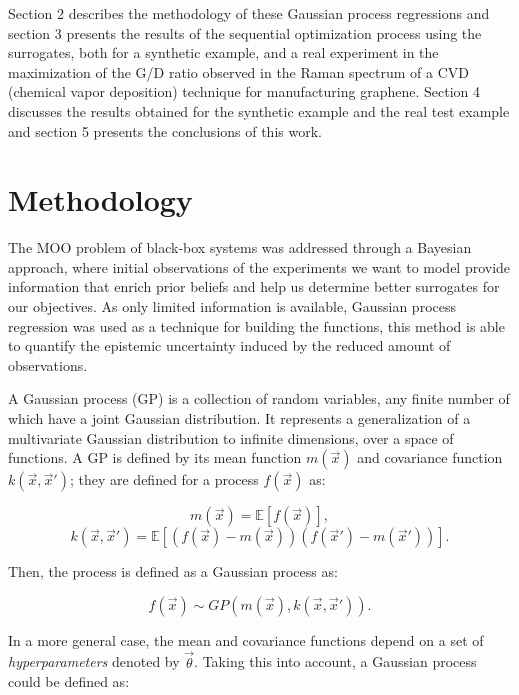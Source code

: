 \documentclass{article}
\begin{document}
Section 2 describes the methodology of these Gaussian process regressions and section 3 presents the results of the sequential optimization process using the surrogates, both for a synthetic example, and a real experiment in the maximization of the G/D ratio observed in the Raman spectrum of a CVD (chemical vapor deposition) technique for manufacturing graphene. Section 4 discusses the results obtained for the synthetic example and the real test example and section 5 presents the conclusions of this work.

\section{Methodology}

The MOO problem of black-box systems was addressed through a Bayesian approach, where initial observations of the experiments we want to model provide information that enrich prior beliefs and help us determine better surrogates for our objectives. As only limited information is available, Gaussian process regression was used as a technique for building the functions, this method is able to quantify the epistemic uncertainty induced by the reduced amount of observations.

A Gaussian process (GP) is a collection of random variables, any finite number of which have a joint Gaussian distribution\cite{Seeger2004}. It represents a generalization of a multivariate Gaussian distribution to infinite dimensions, over a space of functions. A GP is defined by its mean function $m(\vec{x})$ and covariance function $k(\vec{x},\vec{x}')$; they are defined for a process $f(\vec{x})$ as:

\begin{equation}
    m(\vec{x}) = \mathbb{E}[f(\vec{x})],
\end{equation}
\begin{equation}
    k(\vec{x},\vec{x}') = \mathbb{E}[(f(\vec{x})-m(\vec{x}))(f(\vec{x}')-m(\vec{x}'))].
\end{equation}

Then, the process is defined as a Gaussian process as: \cite{Seeger2004}

\begin{equation}
    f(\vec{x}) \sim GP(m(\vec{x}), k(\vec{x},\vec{x}')).
\end{equation}

In a more general case, the mean and covariance functions depend on a set of \textit{hyperparameters} denoted by $\vec{\theta}$. Taking this into account, a Gaussian process could be defined as:
\end{document}
